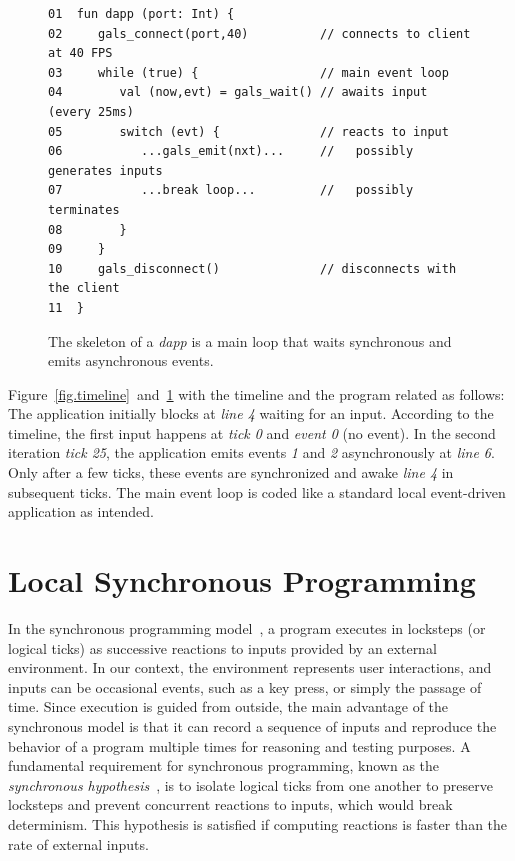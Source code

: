 \documentclass[sigplan,screen]{acmart}
\begin{document}
\begin{figure}[t]
{\scriptsize
\begin{verbatim}
01  fun dapp (port: Int) {
02     gals_connect(port,40)          // connects to client at 40 FPS
03     while (true) {                 // main event loop
04        val (now,evt) = gals_wait() // awaits input (every 25ms)
05        switch (evt) {              // reacts to input
06           ...gals_emit(nxt)...     //   possibly generates inputs
07           ...break loop...         //   possibly terminates
08        }
09     }
10     gals_disconnect()              // disconnects with the client
11  }
\end{verbatim}
}
  \caption{
    \label{fig.skel}
    The skeleton of a \emph{dapp} is a main loop that waits synchronous and
    emits asynchronous events.
  }
\end{figure}

Figure~\ref{fig.timeline}~and~\ref{fig.skel} with the timeline and the program
related as follows:
The application initially blocks at \emph{line 4} waiting for an input.
According to the timeline, the first input happens at \emph{tick 0} and
\emph{event 0} (no event).
In the second iteration \emph{tick 25}, the application emits events \emph{1}
and \emph{2} asynchronously at \emph{line 6}.
Only after a few ticks, these events are synchronized and awake \emph{line 4}
in subsequent ticks.
The main event loop is coded like a standard local event-driven application as
intended.

\section{Local Synchronous Programming}
\label{sec.sync}

In the synchronous programming model~\cite{sync}, a program executes in
locksteps (or logical ticks) as successive reactions to inputs provided by an
external environment.
In our context, the environment represents user interactions, and inputs can be
occasional events, such as a key press, or simply the passage of time.
Since execution is guided from outside, the main advantage of the synchronous
model is that it can record a sequence of inputs and reproduce the behavior of
a program multiple times for reasoning and testing purposes.
A fundamental requirement for synchronous programming, known as the
\emph{synchronous hypothesis}~\cite{hypo}, is to isolate logical ticks from one
another to preserve locksteps and prevent concurrent reactions to inputs, which
would break determinism.
This hypothesis is satisfied if computing reactions is faster than the rate of
external inputs.
\end{document}
